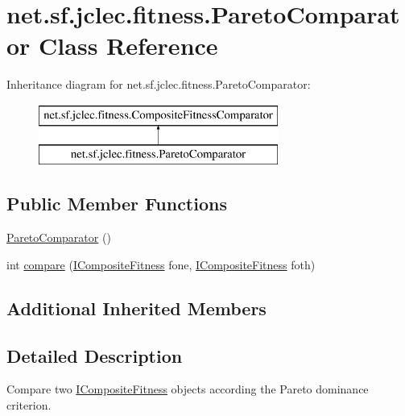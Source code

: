 \hypertarget{classnet_1_1sf_1_1jclec_1_1fitness_1_1_pareto_comparator}{\section{net.\-sf.\-jclec.\-fitness.\-Pareto\-Comparator Class Reference}
\label{classnet_1_1sf_1_1jclec_1_1fitness_1_1_pareto_comparator}
}
Inheritance diagram for net.\-sf.\-jclec.\-fitness.\-Pareto\-Comparator\-:\begin{figure}[H]
\begin{center}
\leavevmode
\includegraphics[height=2.000000cm]{classnet_1_1sf_1_1jclec_1_1fitness_1_1_pareto_comparator}
\end{center}
\end{figure}
\subsection*{Public Member Functions}
\begin{DoxyCompactItemize}
\item 
\hyperlink{classnet_1_1sf_1_1jclec_1_1fitness_1_1_pareto_comparator_ab29757271af73f3658fc028c9da6629a}{Pareto\-Comparator} ()
\item 
int \hyperlink{classnet_1_1sf_1_1jclec_1_1fitness_1_1_pareto_comparator_af38a1bbd5a0c5e5b633bb4da8ef8e2a2}{compare} (\hyperlink{interfacenet_1_1sf_1_1jclec_1_1fitness_1_1_i_composite_fitness}{I\-Composite\-Fitness} fone, \hyperlink{interfacenet_1_1sf_1_1jclec_1_1fitness_1_1_i_composite_fitness}{I\-Composite\-Fitness} foth)
\end{DoxyCompactItemize}
\subsection*{Additional Inherited Members}


\subsection{Detailed Description}
Compare two \hyperlink{interfacenet_1_1sf_1_1jclec_1_1fitness_1_1_i_composite_fitness}{I\-Composite\-Fitness} objects according the Pareto dominance criterion.

